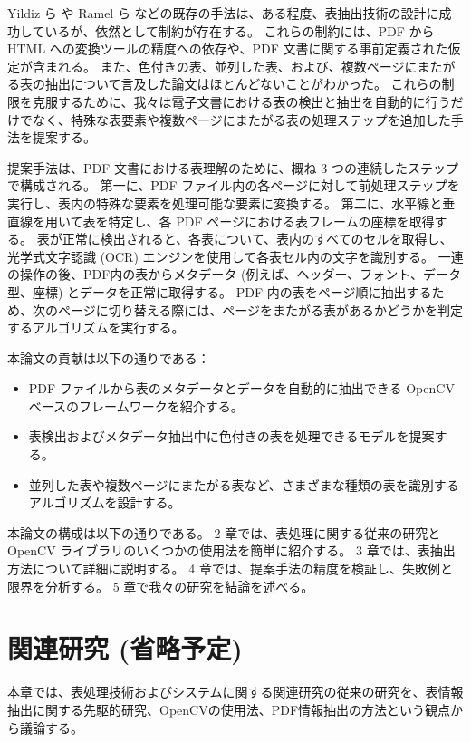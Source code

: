 \documentclass[uplatex, twocolumn,10pt]{jsarticle}
\begin{document}
Yildiz ら \cite{bib01} や Ramel ら \cite{bib02} などの既存の手法は、ある程度、表抽出技術の設計に成功しているが、依然として制約が存在する。
これらの制約には、PDF から HTML への変換ツールの精度への依存や、PDF 文書に関する事前定義された仮定が含まれる。
また、色付きの表、並列した表、および、複数ページにまたがる表の抽出について言及した論文はほとんどないことがわかった。
これらの制限を克服するために、我々は電子文書における表の検出と抽出を自動的に行うだけでなく、特殊な表要素や複数ページにまたがる表の処理ステップを追加した手法を提案する。

提案手法は、PDF 文書における表理解のために、概ね 3 つの連続したステップで構成される。
第一に、PDF ファイル内の各ページに対して前処理ステップを実行し、表内の特殊な要素を処理可能な要素に変換する。
第二に、水平線と垂直線を用いて表を特定し、各 PDF ページにおける表フレームの座標を取得する。
表が正常に検出されると、各表について、表内のすべてのセルを取得し、光学式文字認識 (OCR) エンジンを使用して各表セル内の文字を識別する。
一連の操作の後、PDF内の表からメタデータ (例えば、ヘッダー、フォント、データ型、座標) とデータを正常に取得する。
PDF 内の表をページ順に抽出するため、次のページに切り替える際には、ページをまたがる表があるかどうかを判定するアルゴリズムを実行する。

本論文の貢献は以下の通りである：
\begin{itemize}
    \item PDF ファイルから表のメタデータとデータを自動的に抽出できる OpenCV ベースのフレームワークを紹介する。
    \item 表検出およびメタデータ抽出中に色付きの表を処理できるモデルを提案する。
    \item 並列した表や複数ページにまたがる表など、さまざまな種類の表を識別するアルゴリズムを設計する。
\end{itemize}

本論文の構成は以下の通りである。
2 章では、表処理に関する従来の研究と OpenCV ライブラリのいくつかの使用法を簡単に紹介する。
3 章では、表抽出方法について詳細に説明する。
4 章では、提案手法の精度を検証し、失敗例と限界を分析する。
5 章で我々の研究を結論を述べる。


\section{関連研究 (省略予定)}

本章では、表処理技術およびシステムに関する関連研究の従来の研究を、表情報抽出に関する先駆的研究、OpenCVの使用法、PDF情報抽出の方法という観点から議論する。
\end{document}
